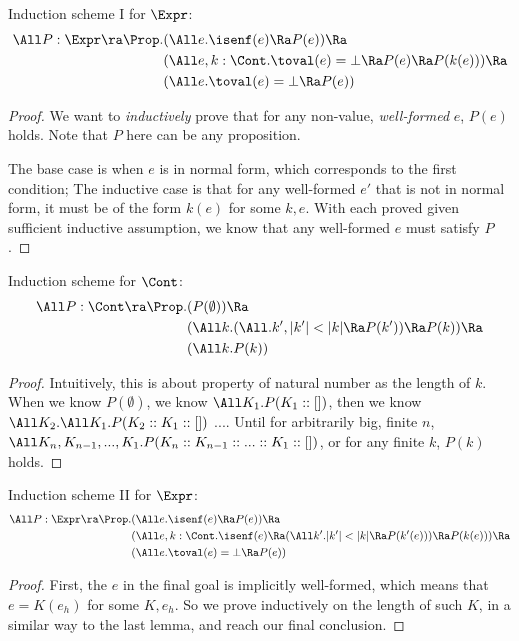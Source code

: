 \begin{lemma}
Induction scheme I for $\Expr$:
\begin{align*}
\All P: \Expr \ra \Prop.
  &(\All e. \isenf(e) \Ra P(e)) \Ra \\
  &(\All e, k: \Cont . \toval(e) = \bot \Ra P(e) \Ra P(k(e))) \Ra\\
  &(\All e. \toval(e) = \bot \Ra P(e))
\end{align*}
\end{lemma}
\begin{proof}
We want to \emph{inductively} prove that for any non-value, \emph{well-formed} $e$, $P(e)$ holds.
Note that $P$ here can be any proposition.

The base case is when $e$ is in normal form, which corresponds to the first condition;
The inductive case is that for any well-formed $e'$ that is not in normal form,
it must be of the form $k(e)$ for some $k, e$. With each proved given sufficient inductive
assumption, we know that any well-formed $e$ must satisfy $P$.
\end{proof}

\begin{lemma}
  Induction scheme for $\Cont$:
  \begin{align*}
    \All P: \Cont \ra \Prop.
      &(P(\emptyset)) \Ra \\
      &(\All k. (\All. k', |k'| < |k| \Ra P(k')) \Ra P(k)) \Ra \\
      &(\All k. P(k))
  \end{align*}
\end{lemma}
\begin{proof}
    Intuitively, this is about property of natural number as the length of $k$.
    When we know $P(\emptyset)$, we know $\All K_1. P(K_1::[])$, then we know
    $\All K_2. \All K_1. P(K_2::K_1::[])$ .... Until for arbitrarily big, finite $n$,
    $\All K_n, K_{n - 1}, ..., K_1. P(K_n::K_{n-1}::...::K_1::[])$, or for any finite
    $k$, $P(k)$ holds.
\end{proof}

\begin{lemma}
Induction scheme II for $\Expr$:
\begin{align*}
\All P: \Expr \ra \Prop.
  &(\All e. \isenf(e) \Ra P(e)) \Ra \\
  &(\All e, k: \Cont . \isenf(e) \Ra (\All k'. |k'| < |k| \Ra P (k'(e))) \Ra P(k(e))) \Ra\\
  &(\All e. \toval(e) = \bot \Ra P(e))
\end{align*}
\end{lemma}
\begin{proof}
    First, the $e$ in the final goal is implicitly well-formed, which means that $e = K(e_h)$
    for some $K, e_h$. So we prove inductively on the length of such $K$, in a similar way to
    the last lemma, and reach our final conclusion.
\end{proof}

